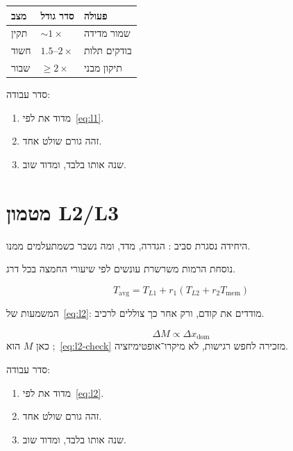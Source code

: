 \begin{tablebox}\centering\small
\begin{tabular}{@{}lll@{}}
\toprule
\textbf{מצב} & \textbf{סדר גודל} & \textbf{פעולה}\\
\midrule
תקין & $\sim 1\times$ & שמור מדידה\\
חשוד & $1.5$–$2\times$ & בודקים תלות\\
שבור & $\ge 2\times$ & תיקון מבני\\
\bottomrule
\end{tabular}
\end{tablebox}

סדר עבודה:
\begin{enumerate}
\item[(\textbf{א})] מדוד את  לפי~\eqref{eq:l1}.
\item[(\textbf{ב})] זהה גורם שולט אחד.
\item[(\textbf{ג})] שנה אותו בלבד, ומדוד שוב.
\end{enumerate}

\chapter{מטמון L2/L3}
\label{ch:l2}

היחידה נסגרת סביב : הגדרה, מדד, ומה נשבר כשמתעלמים ממנו.

\begin{defbox}[frametitle={הגדרה — מטמון L2/L3}]
נוסחת הרמות משרשרת עונשים לפי שיעורי החמצה בכל דרג.
\end{defbox}

\begin{equation}
\label{eq:l2}
T_{\mathrm{avg}}=T_{L1}+r_1(T_{L2}+r_2 T_{\mathrm{mem}})
\end{equation}

המשמעות של~\eqref{eq:l2}: מודדים את  קודם, ורק אחר כך צוללים לרכיב.

\begin{equation}
\label{eq:l2-check}
\Delta M \propto \Delta x_{\mathrm{dom}}
\end{equation}
כאן $M$ הוא ;~\eqref{eq:l2-check} מזכירה לחפש רגישות, לא מיקרו־אופטימיזציה.

סדר עבודה:
\begin{enumerate}
\item[(\textbf{א})] מדוד את  לפי~\eqref{eq:l2}.
\item[(\textbf{ב})] זהה גורם שולט אחד.
\item[(\textbf{ג})] שנה אותו בלבד, ומדוד שוב.
\end{enumerate}

